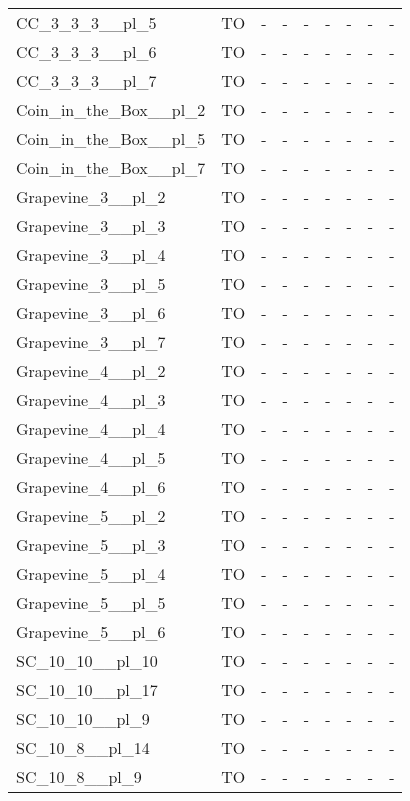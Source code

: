 \documentclass{article}
\begin{document}
\begin{tabular}{lcccccccc}
CC\_3\_3\_3\_\_pl\_5 & TO & - & - & - & - & - & - & - \\
CC\_3\_3\_3\_\_pl\_6 & TO & - & - & - & - & - & - & - \\
CC\_3\_3\_3\_\_pl\_7 & TO & - & - & - & - & - & - & - \\
Coin\_in\_the\_Box\_\_pl\_2 & TO & - & - & - & - & - & - & - \\
Coin\_in\_the\_Box\_\_pl\_5 & TO & - & - & - & - & - & - & - \\
Coin\_in\_the\_Box\_\_pl\_7 & TO & - & - & - & - & - & - & - \\
Grapevine\_3\_\_pl\_2 & TO & - & - & - & - & - & - & - \\
Grapevine\_3\_\_pl\_3 & TO & - & - & - & - & - & - & - \\
Grapevine\_3\_\_pl\_4 & TO & - & - & - & - & - & - & - \\
Grapevine\_3\_\_pl\_5 & TO & - & - & - & - & - & - & - \\
Grapevine\_3\_\_pl\_6 & TO & - & - & - & - & - & - & - \\
Grapevine\_3\_\_pl\_7 & TO & - & - & - & - & - & - & - \\
Grapevine\_4\_\_pl\_2 & TO & - & - & - & - & - & - & - \\
Grapevine\_4\_\_pl\_3 & TO & - & - & - & - & - & - & - \\
Grapevine\_4\_\_pl\_4 & TO & - & - & - & - & - & - & - \\
Grapevine\_4\_\_pl\_5 & TO & - & - & - & - & - & - & - \\
Grapevine\_4\_\_pl\_6 & TO & - & - & - & - & - & - & - \\
Grapevine\_5\_\_pl\_2 & TO & - & - & - & - & - & - & - \\
Grapevine\_5\_\_pl\_3 & TO & - & - & - & - & - & - & - \\
Grapevine\_5\_\_pl\_4 & TO & - & - & - & - & - & - & - \\
Grapevine\_5\_\_pl\_5 & TO & - & - & - & - & - & - & - \\
Grapevine\_5\_\_pl\_6 & TO & - & - & - & - & - & - & - \\
SC\_10\_10\_\_pl\_10 & TO & - & - & - & - & - & - & - \\
SC\_10\_10\_\_pl\_17 & TO & - & - & - & - & - & - & - \\
SC\_10\_10\_\_pl\_9 & TO & - & - & - & - & - & - & - \\
SC\_10\_8\_\_pl\_14 & TO & - & - & - & - & - & - & - \\
SC\_10\_8\_\_pl\_9 & TO & - & - & - & - & - & - & - \\

\end{tabular}
\end{document}
